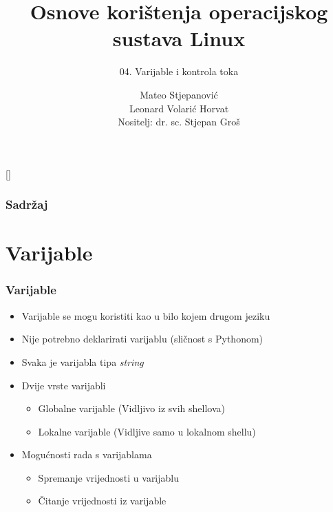 \documentclass{beamer}
\title{Osnove korištenja operacijskog sustava Linux}
\subtitle{04. Varijable i kontrola toka}
\author[Mateo Stjepanović]{Mateo Stjepanović\\Leonard Volarić Horvat\\{\small Nositelj: dr. sc. Stjepan Groš}}
\institute[FER]{Sveučilište u Zagrebu \\
				Fakultet elektrotehnike i računarstva}
\date{\todayiso}
\begin{document}
{
[] %

\begin{frame}
\maketitle
\end{frame}
}

\begin{frame}
\frametitle{Sadržaj}
\tableofcontents
\end{frame}

\section{Varijable}
\begin{frame}[t]
\frametitle{Varijable}
\begin{itemize}
	\item Varijable se mogu koristiti kao u bilo kojem drugom jeziku
	\item Nije potrebno deklarirati varijablu (sličnost s Pythonom)
 	\item Svaka je varijabla tipa \textit{string}
	\item Dvije vrste varijabli
  	\begin{itemize}
  		\item Globalne varijable (Vidljivo iz svih shellova)
  		\item Lokalne varijable (Vidljive samo u lokalnom shellu)
  	\end{itemize}
  
	\item Mogućnosti rada s varijablama
 	\begin{itemize}
 		\item Spremanje vrijednosti u varijablu
		\item Čitanje vrijednosti iz varijable
	\end{itemize}
\end{itemize}
\end{frame}
\end{document}
